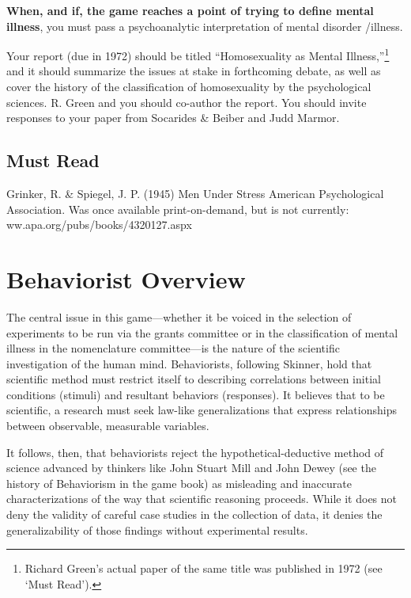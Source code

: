 \begin{refsection}
\textbf{When, and if, the game reaches a point of trying to define mental illness}, you must pass a psychoanalytic interpretation of mental disorder \slash  illness.

Your report (due in 1972) should be titled “Homosexuality as Mental Illness,”\footnote{Richard Green's actual paper of the same title was published in 1972 (see `Must Read').} and it should summarize the issues at stake in forthcoming debate, as well as cover the history of the classification of homosexuality by the psychological sciences. R. Green and you should co-author the report. You should invite responses to your paper from Socarides \& Beiber and Judd Marmor.

\section{Must Read}
\label{mustread}

Grinker, R. \& Spiegel, J. P. (1945) Men Under Stress American Psychological Association. Was once available print-on-demand, but is not currently: ww.apa.org\slash pubs\slash books\slash 4320127.aspx

\pagebreak 

\chapter{Behaviorist Overview}
\label{behavioristoverview}

The central issue in this game—whether it be voiced in the selection of experiments to be run via the grants committee or in the classification of mental illness in the nomenclature committee—is the nature of the scientific investigation of the human mind. Behaviorists, following Skinner, hold that scientific method must restrict itself to describing correlations between initial conditions (stimuli) and resultant behaviors (responses). It believes that to be scientific, a research must seek law-like generalizations that express relationships between observable, measurable variables.

It follows, then, that behaviorists reject the hypothetical-deductive method of science advanced by thinkers like John Stuart Mill and John Dewey (see the history of Behaviorism in the game book) as misleading and inaccurate characterizations of the way that scientific reasoning proceeds. While it does not deny the validity of careful case studies in the collection of data, it denies the generalizability of those findings without experimental results.


\end{refsection}
